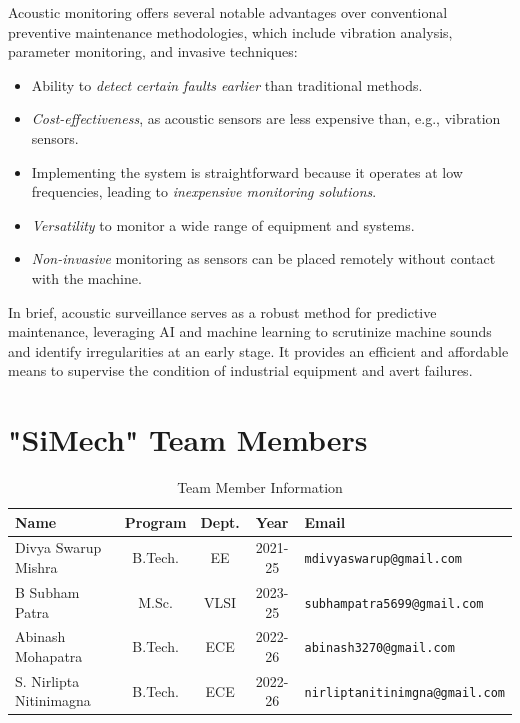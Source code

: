 \documentclass[12pt,twoside]{article}
\begin{document}
Acoustic monitoring offers several notable advantages over conventional preventive maintenance methodologies, which include vibration analysis, parameter monitoring, and invasive techniques:
\begin{itemize}
    \item Ability to \textit{detect certain faults earlier} than traditional methods.
    \item \textit{Cost-effectiveness}, as acoustic sensors are less expensive than, e.g., vibration sensors.
    \item Implementing the system is straightforward because it operates at low frequencies, leading to \textit{inexpensive monitoring solutions}.
    \item \textit{Versatility} to monitor a wide range of equipment and systems.
    \item \textit{Non-invasive} monitoring as sensors can be placed remotely without contact with the machine.
\end{itemize}

In brief, acoustic surveillance serves as a robust method for predictive maintenance, leveraging AI and machine learning to scrutinize machine sounds and identify irregularities at an early stage. It provides an efficient and affordable means to supervise the condition of industrial equipment and avert failures.


\section{"SiMech" Team Members}
\begin{table}[h]
    \centering
    \begin{tabular}{|l|c|c|c|l|}
        \hline
        \textbf{Name} & \textbf{Program} & \textbf{Dept.} & \textbf{Year} & \textbf{Email} \\ \hline\hline
       Divya Swarup Mishra & B.Tech. & EE & 2021-25 & \texttt{mdivyaswarup@gmail.com}\\ \hline
       B Subham Patra & M.Sc. & VLSI & 2023-25 & \texttt{subhampatra5699@gmail.com}\\ \hline
    Abinash Mohapatra & B.Tech. & ECE & 2022-26 & \texttt{abinash3270@gmail.com} \\ \hline
     S. Nirlipta Nitinimagna & B.Tech. & ECE & 2022-26 & \texttt{nirliptanitinimgna@gmail.com}\\ \hline
    \end{tabular}
    \caption{Team Member Information}
    \label{tab:student_info}
\end{table}
\end{document}

